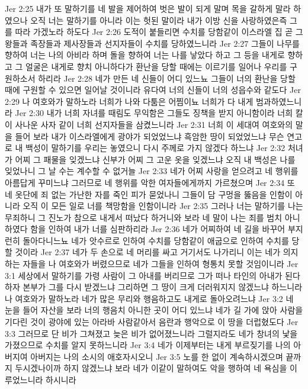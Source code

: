Jer 2:25  내가 또 말하기를 네 발을 제어하여 벗은 발이 되게 말며 목을 갈하게 말라 하였으나 오직 너는 말하기를 아니라 이는 헛된 말이라 내가 이방 신을 사랑하였은즉 그를 따라 가겠노라 하도다
Jer 2:26  도적이 붙들리면 수치를 당함같이 이스라엘 집 곧 그 왕들과 족장들과 제사장들과 선지자들이 수치를 당하였느니라
Jer 2:27  그들이 나무를 향하여 너는 나의 아비라 하며 돌을 향하여 너는 나를 낳았다 하고 그 등을 내게로 향하고 그 얼굴은 내게로 향치 아니하다가 환난을 당할 때에는 이르기를 일어나 우리를 구원하소서 하리라
Jer 2:28  네가 만든 네 신들이 어디 있느뇨 그들이 너의 환난을 당할 때에 구원할 수 있으면 일어날 것이니라 유다여 너의 신들이 너의 성읍수와 같도다
Jer 2:29  나 여호와가 말하노라 너희가 나와 다툼은 어찜이뇨 너희가 다 내게 범과하였느니라
Jer 2:30  내가 너희 자녀를 때림도 무익함은 그들도 징책을 받지 아니함이라 너희 칼이 사나운 사자 같이 너희 선지자들을 삼켰느니라
Jer 2:31  너희 이 세대여 여호와의 말을 들어 보라 내가 이스라엘에게 광야가 되었었느냐 흑암한 땅이 되었었느냐 무슨 연고로 내 백성이 말하기를 우리는 놓였으니 다시 주께로 가지 않겠다 하느냐
Jer 2:32  처녀가 어찌 그 패물을 잊겠느냐 신부가 어찌 그 고운 옷을 잊겠느냐 오직 내 백성은 나를 잊었나니 그 날 수는 계수할 수 없거늘
Jer 2:33  네가 어찌 사랑을 얻으려고 네 행위를 아름답게 꾸미느냐 그러므로 네 행위를 악한 여자들에게까지 가르쳤으며
Jer 2:34  또 네 옷단에 죄 없는 가난한 자를 죽인 피가 묻었나니 그들이 담 구멍을 뚫음을 인함이 아니라 오직 이 모든 일로 너를 책망함을 인함이니라
Jer 2:35  그러나 너는 말하기를 나는 무죄하니 그 진노가 참으로 내게서 떠났다 하거니와 보라 네 말이 나는 죄를 범치 아니하였다 함을 인하여 내가 너를 심판하리라
Jer 2:36  네가 어찌하여 네 길을 바꾸어 부지런히 돌아다니느뇨 네가 앗수르로 인하여 수치를 당함같이 애굽으로 인하여 수치를 당할 것이라
Jer 2:37  네가 두 손으로 네 머리를 싸고 거기서도 나가리니 이는 네가 의지하는 자들을 나 여호와가 버렸으므로 네가 그들을 인하여 형통치 못할 것임이니라
Jer 3:1  세상에서 말하기를 가령 사람이 그 아내를 버리므로 그가 떠나 타인의 아내가 된다 하자 본부가 그를 다시 받겠느냐 그리하면 그 땅이 크게 더러워지지 않겠느냐 하느니라 나 여호와가 말하노라 네가 많은 무리와 행음하고도 내게로 돌아오려느냐
Jer 3:2  네 눈을 들어 자산을 보라 너의 행음치 아니한 곳이 어디 있느냐 네가 길 가에 앉아 사람을 기다린 것이 광야에 있는 아라바 사람같아서 음란과 행악으로 이 땅을 더럽혔도다
Jer 3:3  그러므로 단 비가 그쳐졌고 늦은 비가 없어졌느니라 그럴지라도 네가 창녀의 낯을 가졌으므로 수치를 알지 못하느니라
Jer 3:4  네가 이제부터는 내게 부르짖기를 나의 아버지여 아버지는 나의 소시의 애호자시오니
Jer 3:5  노를 한 없이 계속하시겠으며 끝까지 두시겠나이까 하지 않겠느냐 보라 네가 이같이 말하여도 악을 행하여 네 욕심을 이루었느니라 하시니라
